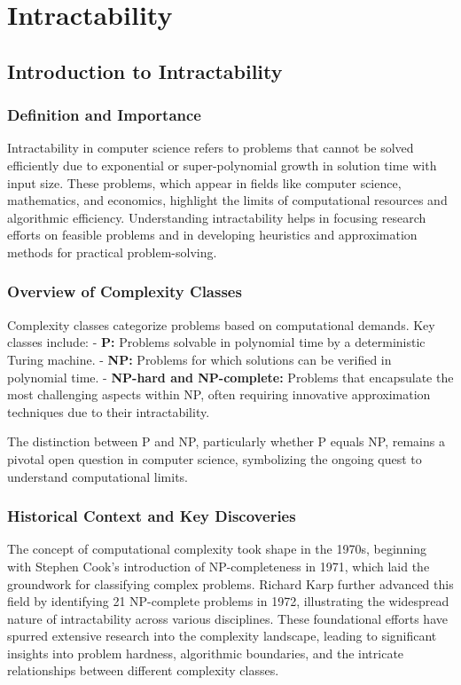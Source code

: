 \chapter{Intractability}

\section{Introduction to Intractability}

\subsection{Definition and Importance}
Intractability in computer science refers to problems that cannot be solved efficiently due to exponential or super-polynomial growth in solution time with input size. These problems, which appear in fields like computer science, mathematics, and economics, highlight the limits of computational resources and algorithmic efficiency. Understanding intractability helps in focusing research efforts on feasible problems and in developing heuristics and approximation methods for practical problem-solving.

\subsection{Overview of Complexity Classes}
Complexity classes categorize problems based on computational demands. Key classes include:
- \textbf{P:} Problems solvable in polynomial time by a deterministic Turing machine.
- \textbf{NP:} Problems for which solutions can be verified in polynomial time.
- \textbf{NP-hard and NP-complete:} Problems that encapsulate the most challenging aspects within NP, often requiring innovative approximation techniques due to their intractability.

The distinction between P and NP, particularly whether P equals NP, remains a pivotal open question in computer science, symbolizing the ongoing quest to understand computational limits.

\subsection{Historical Context and Key Discoveries}
The concept of computational complexity took shape in the 1970s, beginning with Stephen Cook's introduction of NP-completeness in 1971, which laid the groundwork for classifying complex problems. Richard Karp further advanced this field by identifying 21 NP-complete problems in 1972, illustrating the widespread nature of intractability across various disciplines. These foundational efforts have spurred extensive research into the complexity landscape, leading to significant insights into problem hardness, algorithmic boundaries, and the intricate relationships between different complexity classes.

